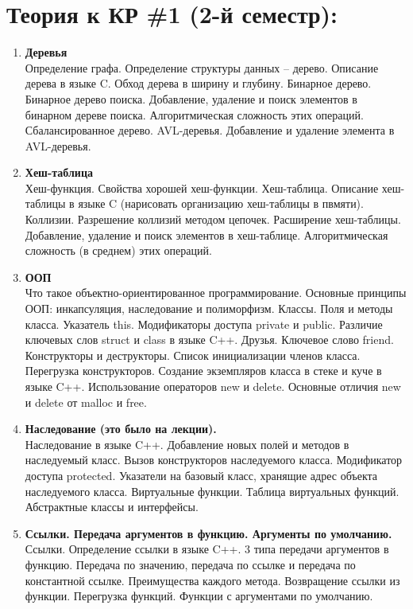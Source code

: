 \documentclass{article}
\begin{document}

\section*{Теория к КР \#1 (2-й семестр):}
\begin{enumerate}

\item  \textbf{Деревья}\\
Определение графа. Определение структуры данных -- дерево. Описание дерева в языке C. Обход дерева в ширину и глубину. Бинарное дерево. Бинарное дерево поиска. Добавление, удаление и поиск элементов в бинарном дереве поиска. Алгоритмическая сложность этих операций. Сбалансированное дерево. AVL-деревья. Добавление и удаление элемента в AVL-деревья.
\\
\item  \textbf{Хеш-таблица}\\
Хеш-функция. Свойства хорошей хеш-функции. Хеш-таблица. Описание хеш-таблицы в языке C (нарисовать организацию хеш-таблицы в пвмяти). Коллизии. Разрешение коллизий методом цепочек. Расширение хеш-таблицы. Добавление, удаление и поиск элементов в хеш-таблице. Алгоритмическая сложность (в среднем) этих операций.

\item  \textbf{ООП}\\
Что такое объектно-ориентированное программирование. Основные принципы ООП: инкапсуляция, наследование и полиморфизм. Классы. Поля и методы класса. Указатель this. Модификаторы доступа private и public.   Различие ключевых слов struct и class в языке C++. Друзья. Ключевое слово friend. Конструкторы и деструкторы. Список инициализации членов класса. Перегрузка конструкторов. Создание экземпляров класса в стеке и куче в языке C++. Использование операторов new и delete. Основные отличия new и delete от malloc и free.
\\

\item \textbf{Наследование (это было на лекции).}\\
Наследование в языке C++. Добавление новых полей и методов в наследуемый класс. Вызов конструкторов наследуемого класса. Модификатор доступа protected. Указатели на базовый класс, хранящие адрес объекта наследуемого класса. Виртуальные функции. Таблица виртуальных функций. Абстрактные классы и интерфейсы. \\

\item \textbf{Ссылки. Передача аргументов в функцию. Аргументы по умолчанию.}\\
Ссылки. Определение ссылки в языке C++. 3 типа передачи аргументов в функцию. Передача по значению, передача по ссылке и передача по константной ссылке. Преимущества каждого метода. Возвращение ссылки из функции. Перегрузка функций. Функции с аргументами по умолчанию.\\


\end{enumerate}
\end{document}
